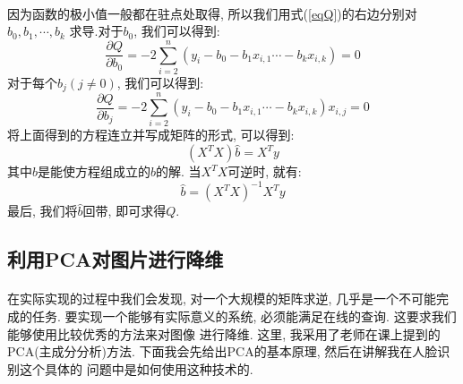 \documentclass[fleqn,10pt]{SelfArx} %
\begin{document}
	\paragraph{}
		因为函数的极小值一般都在驻点处取得, 所以我们用式(\ref{eqQ})的右边分别对$b_0, b_1, \cdots, b_k$
		求导.对于$b_0$, 我们可以得到:
		\begin{equation}
			\frac{\partial Q}{\partial b_0} = -2\sum_{i=2}^n (y_i - b_0 - b_1x_{i,1} \cdots - b_kx_{i,k}) = 0
		\end{equation}
		对于每个$b_j (j \not= 0)$, 我们可以得到:
		\begin{equation}
			\frac{\partial Q}{\partial b_j} = -2\sum_{i=2}^n (y_i - b_0 - b_1x_{i,1} \cdots - b_kx_{i,k})x_{i,j} = 0
		\end{equation}
		将上面得到的方程连立并写成矩阵的形式, 可以得到:
		\begin{equation}
			(X^{T}X)\hat{b} = X^{T}y
		\end{equation}
		其中$\hat{b}$是能使方程组成立的$b$的解. 当$X^{T}X$可逆时, 就有:
		\begin{equation}
			\hat{b} = (X^{T}X)^{-1}X^{T}y
			\label{eq:inv}
		\end{equation}
		最后, 我们将$\hat{b}$回带, 即可求得$Q$.
\subsection{利用PCA对图片进行降维}
	\paragraph{}
		在实际实现的过程中我们会发现, 对一个大规模的矩阵求逆,
		几乎是一个不可能完成的任务. 要实现一个能够有实际意义的系统,
		必须能满足在线的查询. 这要求我们能够使用比较优秀的方法来对图像
		进行降维. 这里, 我采用了老师在课上提到的PCA(主成分分析)方法.
		下面我会先给出PCA的基本原理, 然后在讲解我在人脸识别这个具体的
		问题中是如何使用这种技术的. 
\end{document}
